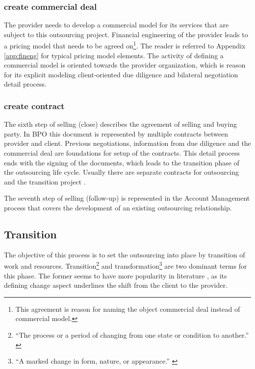 	\subsubsection{create commercial deal}
	
	The provider needs to develop a commercial model for its services that are subject to this outsourcing project. Financial engineering of the provider leads to a pricing model that needs to be agreed on\footnote{This agreement is reason for naming the object commercial deal instead of commercial model.}. The reader is referred to Appendix \ref{app:fineng} for typical pricing model elements. The activity of defining a commercial model is oriented towards the provider organization, which is reason for its explicit modeling \wrt client-oriented due diligence and bilateral negotiation detail process. 
	
	\subsubsection{create contract}
	
	The sixth step of selling (close) describes the agreement of selling and buying party. In \acrshort{BPO} this document is represented by multiple contracts between provider and client. Previous negotiations, information from due diligence and the commercial deal are foundations for setup of the contracts. This detail process ends with the signing of the documents, which leads to the transition phase of the outsourcing life cycle. Usually there are separate contracts for outsourcing and the transition project \citep{bitkom2008}. 
	
	The seventh step of selling (follow-up) is represented in the Account Management process that covers the development of an existing outsourcing relationship. 
	
		
	\subsection{Transition}
	The objective of this process is to set the outsourcing into place by transition of work and resources. Transition\footnote{\enquote{The process or a period of changing from one state or condition to another.} \citep{oxfordtransition}} and transformation\footnote{\enquote{A marked change in form, nature, or appearance.} \citep{oxfordtransformation}} are two dominant terms for this phase. The former seems to have more popularity in literature \citep{perunovic2007outsourcing}, as its defining change aspect underlines the shift from the client to the provider. 
	
